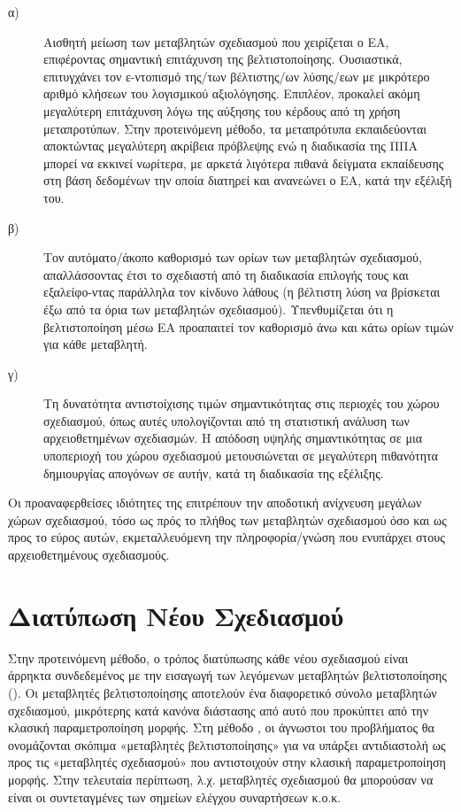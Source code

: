 \begin{description}
  \item[α)] Αισθητή μείωση των μεταβλητών σχεδιασμού που χειρίζεται ο ΕΑ, επιφέροντας σημαντική επιτάχυνση της βελτιστοποίησης. Ουσιαστικά, επιτυγχάνει τον ε-ντοπισμό της/των βέλτιστης/ων λύσης/εων με μικρότερο αριθμό κλήσεων του λογισμικού αξιολόγησης. Επιπλέον, προκαλεί ακόμη μεγαλύτερη επιτάχυνση λόγω της αύξησης του κέρδους από τη χρήση μεταπροτύπων. Στην προτεινόμενη μέθοδο, τα μεταπρότυπα εκπαιδεύονται αποκτώντας μεγαλύτερη ακρίβεια πρόβλεψης ενώ η διαδικασία της ΠΠΑ μπορεί να εκκινεί νωρίτερα, με αρκετά λιγότερα πιθανά δείγματα εκπαίδευσης στη βάση δεδομένων την οποία διατηρεί και ανανεώνει ο ΕΑ, κατά την εξέλιξή του.   
  \item[β)] Τον αυτόματο/άκοπο καθορισμό των ορίων των μεταβλητών σχεδιασμού, απαλλάσσοντας έτσι το σχεδιαστή από τη διαδικασία επιλογής τους και εξαλείφο-ντας παράλληλα τον κίνδυνο λάθους (η βέλτιστη λύση να βρίσκεται έξω από τα όρια των μεταβλητών σχεδιασμού). Υπενθυμίζεται ότι η βελτιστοποίηση μέσω ΕΑ προαπαιτεί τον καθορισμό άνω και κάτω ορίων τιμών για κάθε μεταβλητή. 
    \item[γ)] Τη δυνατότητα αντιστοίχισης τιμών σημαντικότητας στις περιοχές του χώρου σχεδιασμού, όπως αυτές υπολογίζονται από τη στατιστική ανάλυση των αρχειοθετημένων σχεδιασμών. Η απόδοση υψηλής σημαντικότητας σε μια υποπεριοχή του χώρου σχεδιασμού μετουσιώνεται σε μεγαλύτερη πιθανότητα δημιουργίας απογόνων σε αυτήν, κατά τη διαδικασία της εξέλιξης.
\end{description}

Οι προαναφερθείσες ιδιότητες της  επιτρέπουν την αποδοτική ανίχνευση μεγάλων χώρων σχεδιασμού, τόσο ως πρός το πλήθος των μεταβλητών σχεδιασμού όσο και ως προς το εύρος αυτών,  εκμεταλλευόμενη την πληροφορία/γνώση που ενυπάρχει στους αρχειοθετημένους σχεδιασμούς.  


\section{Διατύπωση Νέου Σχεδιασμού}
Στην προτεινόμενη μέθοδο, ο τρόπος διατύπωσης κάθε νέου σχεδιασμού είναι άρρηκτα συνδεδεμένος με την εισαγωγή των λεγόμενων μεταβλητών βελτιστοποίησης (). Οι μεταβλητές βελτιστοποίησης αποτελούν ένα διαφορετικό σύνολο μεταβλητών σχεδιασμού, μικρότερης κατά κανόνα διάστασης από αυτό που προκύπτει από την κλασική παραμετροποίηση μορφής. Στη μέθοδο , οι άγνωστοι του προβλήματος θα ονομάζονται σκόπιμα «μεταβλητές βελτιστοποίησης»  για να υπάρξει αντιδιαστολή ως προς τις «μεταβλητές σχεδιασμού» που αντιστοιχούν στην κλασική παραμετροποίηση μορφής. Στην τελευταία περίπτωση, λ.χ. μεταβλητές σχεδιασμού θα μπορούσαν να είναι οι συντεταγμένες των σημείων ελέγχου συναρτήσεων  κ.ο.κ.        

